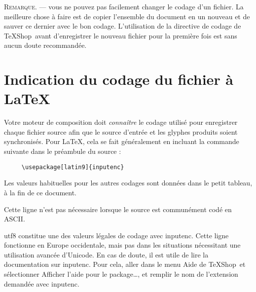 \documentclass[11pt,french]{article}
\newcommand{\TS}{\textsf{\TeX Shop}}
\newcommand{\acr}[1]{\textsf{#1}}
\newcommand{\cmd}[1]{\textsf{#1}}
\newcommand{\mnu}[1]{\textsf{#1}}
\begin{document}
\textsc{Remarque}. --- vous ne pouvez pas facilement changer le codage d'un fichier. La meilleure chose à faire est de copier l'ensemble du document en un nouveau et de sauver ce dernier avec le bon codage. L'utilisation de la directive de codage de \TS\ avant d'enregistrer le nouveau fichier pour la première fois est sans aucun doute recommandée.

\section{Indication du codage du fichier à \LaTeX}

Votre moteur de composition doit \emph{connaître} le codage utilisé pour enregistrer chaque fichier source afin que le source d'entrée et les glyphes produits soient synchronisés. Pour \LaTeX, cela se fait généralement en incluant la commande suivante dans le préambule du source :
\begin{verbatim}
     \usepackage[latin9]{inputenc}	
\end{verbatim}
Les valeurs habituelles pour les autres codages sont données dans le petit tableau, à la fin de ce document.

Cette ligne n'est pas nécessaire lorsque le source est communément codé en \acr{ASCII}.

\cmd{utf8} constitue une des valeurs légales de codage avec \cmd{inputenc}. Cette ligne fonctionne en Europe occidentale, mais pas dans les situations nécessitant une utilisation avancée d'\cmd{Unicode}. En cas de doute, il est utile de lire la documentation sur \cmd{inputenc}. Pour cela, aller dans le menu \mnu{Aide} de \TS\ et sélectionner \cmd{Afficher l'aide pour le package…}, et remplir le nom de l'extension demandée avec \cmd{inputenc}.
\end{document}
